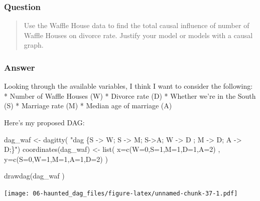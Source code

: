 \documentclass[
]{book}
\newenvironment{Shaded}{\begin{snugshade}}{\end{snugshade}}
\newcommand{\AttributeTok}[1]{\textcolor[rgb]{0.77,0.63,0.00}{#1}}
\newcommand{\DecValTok}[1]{\textcolor[rgb]{0.00,0.00,0.81}{#1}}
\newcommand{\FunctionTok}[1]{\textcolor[rgb]{0.00,0.00,0.00}{#1}}
\newcommand{\NormalTok}[1]{#1}
\newcommand{\OtherTok}[1]{\textcolor[rgb]{0.56,0.35,0.01}{#1}}
\newcommand{\StringTok}[1]{\textcolor[rgb]{0.31,0.60,0.02}{#1}}
\begin{document}
\hypertarget{question-55}{%
\subsubsection*{Question}\label{question-55}}

\begin{quote}
Use the Waffle House data to find the total causal influence of number of Waffle Houses on divorce rate. Justify your model or models with a causal graph.
\end{quote}

\hypertarget{answer-55}{%
\subsubsection*{Answer}\label{answer-55}}

Looking through the available variables, I think I want to consider the following:
* Number of Waffle Houses (W)
* Divorce rate (D)
* Whether we're in the South (S)
* Marriage rate (M)
* Median age of marriage (A)

Here's my proposed DAG:

\begin{Shaded}
\begin{Highlighting}[]
\NormalTok{dag\_waf }\OtherTok{\textless{}{-}} \FunctionTok{dagitty}\NormalTok{( }\StringTok{"dag \{S {-}\textgreater{} W; S {-}\textgreater{} M; S{-}\textgreater{}A; W {-}\textgreater{} D ; M {-}\textgreater{} D; A {-}\textgreater{} D;\}"}\NormalTok{)}
\FunctionTok{coordinates}\NormalTok{(dag\_waf) }\OtherTok{\textless{}{-}} \FunctionTok{list}\NormalTok{( }\AttributeTok{x=}\FunctionTok{c}\NormalTok{(}\AttributeTok{W=}\DecValTok{0}\NormalTok{,}\AttributeTok{S=}\DecValTok{1}\NormalTok{,}\AttributeTok{M=}\DecValTok{1}\NormalTok{,}\AttributeTok{D=}\DecValTok{1}\NormalTok{,}\AttributeTok{A=}\DecValTok{2}\NormalTok{) , }\AttributeTok{y=}\FunctionTok{c}\NormalTok{(}\AttributeTok{S=}\DecValTok{0}\NormalTok{,}\AttributeTok{W=}\DecValTok{1}\NormalTok{,}\AttributeTok{M=}\DecValTok{1}\NormalTok{,}\AttributeTok{A=}\DecValTok{1}\NormalTok{,}\AttributeTok{D=}\DecValTok{2}\NormalTok{) )}

\FunctionTok{drawdag}\NormalTok{(dag\_waf )}
\end{Highlighting}
\end{Shaded}

\texttt{[image: 06-haunted\_dag\_files/figure-latex/unnamed-chunk-37-1.pdf]}
\end{document}
